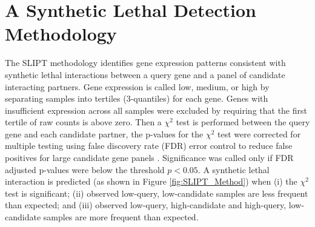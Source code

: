 \section{A Synthetic Lethal Detection Methodology} \label{methods:SLIPT}
The SLIPT methodology identifies gene expression patterns consistent with synthetic lethal interactions between a query gene and a panel of candidate interacting partners. Gene expression is called low, medium, or high by separating samples into tertiles (3-quantiles) for each gene. Genes with insufficient expression across all samples were excluded by requiring that the first tertile of raw counts is above zero. Then a $\chi^2$ test is performed between the query gene and each candidate partner, the p-values for the $\chi^2$ test were corrected for multiple testing using false discovery rate (FDR) error control to reduce false positives for large candidate gene panels \citep{fdr1995}. Significance was called only if FDR adjusted p-values were below the threshold $p < 0.05$. A synthetic lethal interaction is predicted  (as shown in Figure \ref{fig:SLIPT_Method}) when (i) the $\chi^2$ test is significant; (ii) observed low-query, low-candidate samples are less frequent than expected; and (iii) observed low-query, high-candidate and high-query, low-candidate samples are more frequent than expected.

